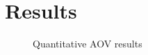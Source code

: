 \graphicspath{ {./content/results/figures/} }

\section{Results} 

\begin{figure}[h]
  \centering
  
  \caption{Quantitative AOV results}
  \label{fig:surveyResults}
\end{figure}
